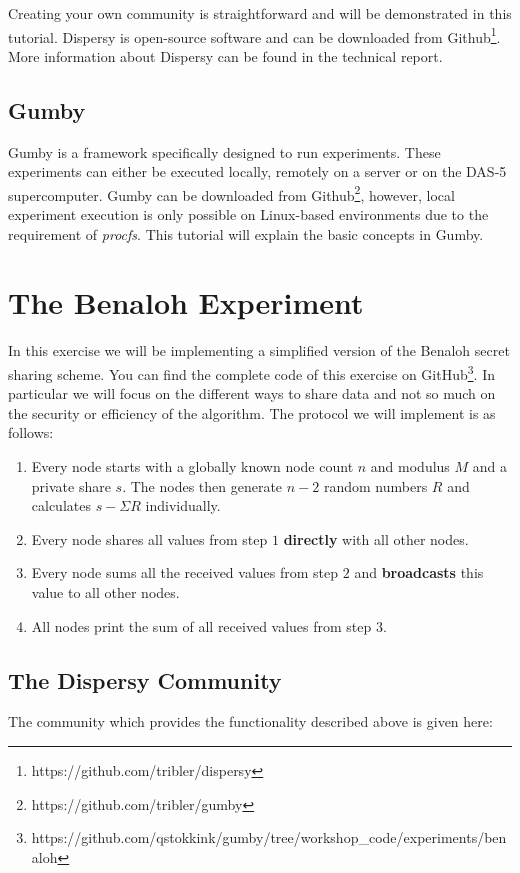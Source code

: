 \documentclass{article}
\begin{document}
Creating your own community is straightforward and will be demonstrated in this tutorial.
Dispersy is open-source software and can be downloaded from Github\footnote{https://github.com/tribler/dispersy}.
More information about Dispersy can be found in the technical report\cite{zeilemaker2013dispersy}.

\subsection{Gumby}
Gumby is a framework specifically designed to run experiments.
These experiments can either be executed locally, remotely on a server or on the DAS-5 supercomputer.
Gumby can be downloaded from Github\footnote{https://github.com/tribler/gumby}, however, local experiment execution is only possible on Linux-based environments due to the requirement of \emph{procfs}.
This tutorial will explain the basic concepts in Gumby.

\section{The Benaloh Experiment}
In this exercise we will be implementing a simplified version of the Benaloh secret sharing scheme.
You can find the complete code of this exercise on GitHub\footnote{https://github.com/qstokkink/gumby/tree/workshop\_code/experiments/benaloh}.
In particular we will focus on the different ways to share data and not so much on the security or efficiency of the algorithm.
The protocol we will implement is as follows:

\begin{enumerate}
\item Every node starts with a globally known node count $n$ and modulus $M$ and a private share $s$.
The nodes then generate $n-2$ random numbers $R$ and calculates $s - \Sigma R$ individually.
\item Every node shares all values from step $1$ \textbf{directly} with all other nodes.
\item Every node sums all the received values from step $2$ and \textbf{broadcasts} this value to all other nodes.
\item All nodes print the sum of all received values from step $3$.
\end{enumerate}

\subsection{The Dispersy Community}
\noindent The community which provides the functionality described above is given here:
\end{document}

